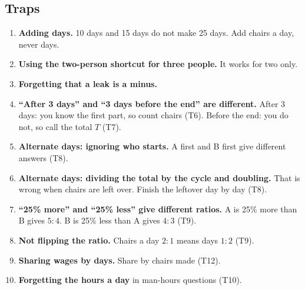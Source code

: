 \documentclass[11pt,a4paper]{article}
\let\oldsubsection\subsection
\renewcommand{\subsection}{\needspace{9\baselineskip}\oldsubsection}
\begin{document}
\subsection*{Traps}
\begin{enumerate}
\item \textbf{Adding days.} 10 days and 15 days do not make 25 days. Add chairs a day, never days.
\item \textbf{Using the two-person shortcut for three people.} It works for two only.
\item \textbf{Forgetting that a leak is a minus.}
\item \textbf{``After 3 days'' and ``3 days before the end'' are different.} After 3 days: you know the first part, so count chairs (T6). Before the end: you do not, so call the total $T$ (T7).
\item \textbf{Alternate days: ignoring who starts.} A first and B first give different answers (T8).
\item \textbf{Alternate days: dividing the total by the cycle and doubling.} That is wrong when chairs are left over. Finish the leftover day by day (T8).
\item \textbf{``25\% more'' and ``25\% less'' give different ratios.} A is 25\% more than B gives $5 : 4$. B is 25\% less than A gives $4 : 3$ (T9).
\item \textbf{Not flipping the ratio.} Chairs a day $2 : 1$ means days $1 : 2$ (T9).
\item \textbf{Sharing wages by days.} Share by chairs made (T12).
\item \textbf{Forgetting the hours a day} in man-hours questions (T10).
\end{enumerate}
\end{document}
